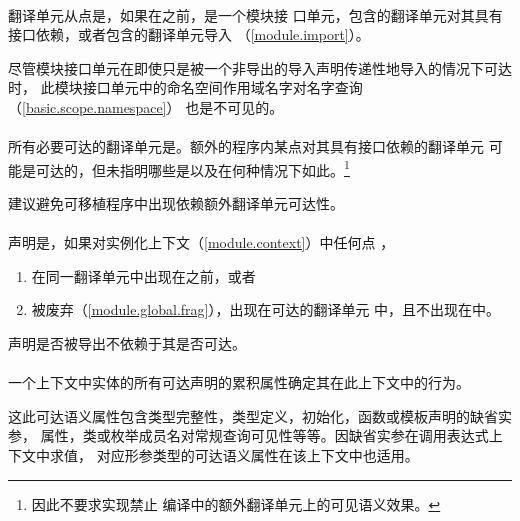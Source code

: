 \paragraph{} %
翻译单元从点是，如果在之前，是一个模块接
口单元，包含的翻译单元对其具有接口依赖，或者包含的翻译单元导入
（\ref{module.import}）。

\begin{note}
  尽管模块接口单元在即使只是被一个非导出的导入声明传递性地导入的情况下可达时，
  此模块接口单元中的命名空间作用域名字对名字查询（\ref{basic.scope.namespace}）
  也是不可见的。
\end{note}

\paragraph{} %
所有必要可达的翻译单元是。额外的程序内某点对其具有接口依赖的翻译单元
可能是可达的，但未指明哪些是以及在何种情况下如此。\footnote{因此不要求实现禁止
编译中的额外翻译单元上的可见语义效果。}

\begin{note}
  建议避免可移植程序中出现依赖额外翻译单元可达性。
\end{note}

\paragraph{} %
声明是，如果对实例化上下文（\ref{module.context}）中任何点
，
\begin{enumerate}
  \item 在同一翻译单元中出现在之前，或者
  \item {}被废弃（\ref{module.global.frag}），出现在可达的翻译单元
    中，且不出现在中。
\end{enumerate}

\begin{note}
  声明是否被导出不依赖于其是否可达。
\end{note}

\paragraph{} %
一个上下文中实体的所有可达声明的累积属性确定其在此上下文中的行为。

\begin{note}
  这此可达语义属性包含类型完整性，类型定义，初始化，函数或模板声明的缺省实参，
  属性，类或枚举成员名对常规查询可见性等等。因缺省实参在调用表达式上下文中求值，
  对应形参类型的可达语义属性在该上下文中也适用。
\end{note}

